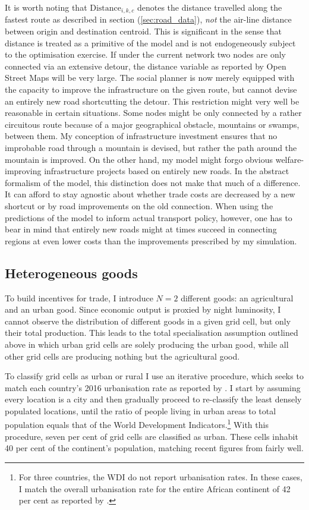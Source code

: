 \documentclass[11pt, oneside]{article}   	%
\let\oldref\ref
\renewcommand{\ref}[1]{(\oldref{#1})}
\begin{document}
It is worth noting that $\textrm{Distance}_{i,k,c}$ denotes the distance travelled along the fastest route as described in section \ref{sec:road_data}, \emph{not} the air-line distance between origin and destination centroid. This is significant in the sense that distance is treated as a primitive of the model and is not endogeneously subject to the optimisation exercise. If under the current network two nodes are only connected via an extensive detour, the distance variable as reported by Open Street Maps will be very large. The social planner is now merely equipped with the capacity to improve the infrastructure on the given route, but cannot devise an entirely new road shortcutting the detour. This restriction might very well be reasonable in certain situations. Some nodes might be only connected by a rather circuitous route because of a major geographical obstacle, mountains or swamps, between them. My conception of infrastructure investment ensures that no improbable road through a mountain is devised, but rather the path around the mountain is improved. On the other hand, my model might forgo obvious welfare-improving infrastructure projects based on entirely new roads. In the abstract formalism of the model, this distinction does not make that much of a difference. It can afford to stay agnostic about whether trade costs are decreased by a new shortcut or by road improvements on the old connection. When using the predictions of the model to  inform actual transport policy, however, one has to bear in mind that entirely new roads might at times succeed in connecting regions at even lower costs than the improvements prescribed by my simulation.

\subsection{Heterogeneous goods}
To build incentives for trade, I introduce $N=2$ different goods: an agricultural and an urban good. Since economic output is proxied by night luminosity, I cannot observe the distribution of different goods in a given grid cell, but only their total production. This leads to the total specialisation assumption outlined above in which urban grid cells are solely producing the urban good, while all other grid cells are producing nothing but the agricultural good.

To classify grid cells as urban or rural I use an iterative procedure, which seeks to match each country's 2016 urbanisation rate as reported by \cite{the_world_bank_world_2017}. I start by assuming every location is a city and then gradually proceed to re-classify the least densely populated locations, until the ratio of people living in urban areas to total population equals that of the World Development Indicators.\footnote{For three countries, the WDI do not report urbanisation rates. In these cases, I match the overall urbanisation rate for the entire African continent of 42 per cent as reported by \cite{lall_africas_2017}.} With this procedure, seven per cent of grid cells are classified as urban. These cells inhabit 40 per cent of the continent's population, matching recent figures from \cite{lall_africas_2017} fairly well.
\end{document}
